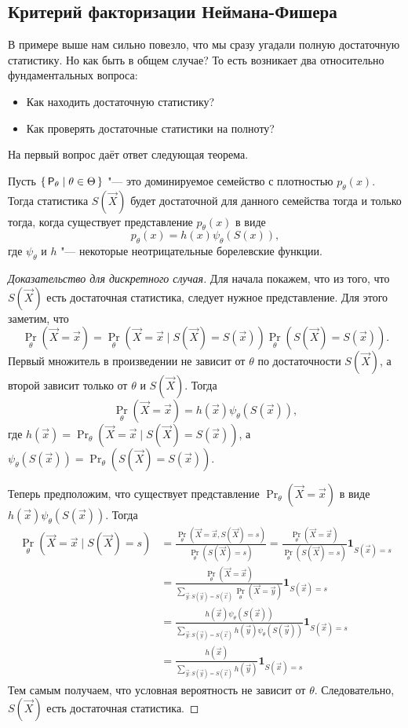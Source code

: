 \subsection{Критерий факторизации Неймана-Фишера}
В примере выше нам сильно повезло, что мы сразу угадали полную достаточную статистику. Но как быть в общем случае? То есть возникает два относительно фундаментальных вопроса:
\begin{itemize}
	\item Как находить достаточную статистику?
	\item Как проверять достаточные статистики на полноту?
\end{itemize}

На первый вопрос даёт ответ следующая теорема.
\begin{theorem}
	Пусть $\set{\mathsf{P}_{\theta} \mid \theta \in \Theta}$ "--- это доминируемое семейство с плотностью $p_{\theta}(x)$. Тогда статистика $S(\vec{X})$ будет достаточной для данного семейства тогда и только тогда, когда существует представление $p_{\theta}(x)$ в виде
	\[
		p_{\theta}(x)
		= h(x)\psi_{\theta}(S(x)),
	\]
	где $\psi_{\theta}$ и $h$ "--- некоторые неотрицательные борелевские функции.
\end{theorem}
\begin{proof}[Доказательство для дискретного случая]
	Для начала покажем, что из того, что $S(\vec{X})$ есть достаточная статистика, следует нужное представление. Для этого заметим, что
	\[
		\Pr_{\theta}(\vec{X} = \vec{x})
		= \Pr_{\theta}(\vec{X} = \vec{x} \mid S(\vec{X}) = S(\vec{x})) \Pr_{\theta}(S(\vec{X}) = S(\vec{x})).
	\]
	Первый множитель в произведении не зависит от $\theta$ по достаточности $S(\vec{X})$, а второй зависит только от $\theta$ и $S(\vec{X})$. Тогда 
	\[
		\Pr_{\theta}(\vec{X} = \vec{x})
		= h(\vec{x})\psi_{\theta}(S(\vec{x})),
	\]
	где $h(\vec{x}) = \Pr_{\theta}(\vec{X} = \vec{x} \mid S(\vec{X}) = S(\vec{x}))$, а $\psi_{\theta}(S(\vec{x})) = \Pr_{\theta}(S(\vec{X}) = S(\vec{x}))$.

	Теперь предположим, что существует представление $\Pr_{\theta}(\vec{X} = \vec{x})$ в виде $h(\vec{x})\psi_{\theta}(S(\vec{x}))$. Тогда
	\begin{align*}
		\Pr_{\theta}(\vec{X} = \vec{x} \mid S(\vec{X}) = s)
		&= \frac{\Pr_{\theta}(\vec{X} = \vec{x}, S(\vec{X}) = s)}{\Pr_{\theta}(S(\vec{X}) = s)}
		= \frac{\Pr_{\theta}(\vec{X} = \vec{x})}{\Pr_{\theta}(S(\vec{X}) = s)}\mathbf{1}_{ S(\vec{x}) = s} \\
		&= \frac{\Pr_{\theta}(\vec{X} = \vec{x})}{\sum_{\vec{y}: S(\vec{y}) = S(\vec{x})} \Pr_{\theta}(\vec{X} = \vec{y})}\mathbf{1}_{ S(\vec{x}) = s} \\
		&= \frac{h(\vec{x})\psi_{\theta}(S(\vec{x}))}{\sum_{\vec{y}: S(\vec{y}) = S(\vec{x})} h(\vec{y})\psi_{\theta}(S(\vec{y}))}\mathbf{1}_{ S(\vec{x}) = s} \\
		&= \frac{h(\vec{x})}{\sum_{\vec{y}: S(\vec{y}) = S(\vec{x})} h(\vec{y})}\mathbf{1}_{S(\vec{x}) = s}
	\end{align*}
	Тем самым получаем, что условная вероятность не зависит от $\theta$. Следовательно, $S(\vec{X})$ есть достаточная статистика.
\end{proof}

